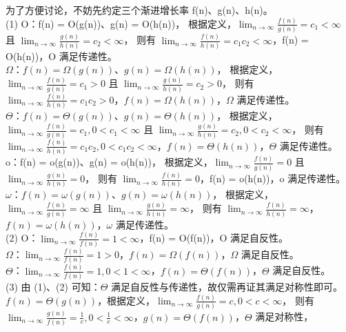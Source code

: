 \documentclass[12pt, a4paper, oneside]{ctexart}
\begin{document}
\newpage
\begin{solution}[2.7]
为了方便讨论，不妨先约定三个渐进增长率 f(n)、g(n)、h(n)。
\\(1) O：f(n) = O(g(n))、g(n) = O(h(n))，
根据定义，$\lim_{n \rightarrow \infty} \frac{f(n)}{g(n)} = c_1 < \infty$ 且 $\lim_{n \rightarrow \infty} \frac{g(n)}{h(n)} = c_2 < \infty$，
则有 $\lim_{n \rightarrow \infty} \frac{f(n)}{h(n)} = c_1c_2 < \infty$，f(n) = O(h(n))，O 满足传递性。
\\$\Omega$：$f(n) = \Omega(g(n))$、$g(n) = \Omega(h(n))$，
根据定义，$\lim_{n \rightarrow \infty} \frac{f(n)}{g(n)} = c_1 > 0$ 且 $\lim_{n \rightarrow \infty} \frac{g(n)}{h(n)} = c_2 > 0$，
则有 $\lim_{n \rightarrow \infty} \frac{f(n)}{h(n)} = c_1 c_2 > 0$，$f(n) = \Omega(h(n))$，$\Omega$ 满足传递性。
\\$\Theta$：$f(n) = \Theta(g(n))$、$g(n) = \Theta(h(n))$，
根据定义，$\lim_{n \rightarrow \infty} \frac{f(n)}{g(n)} = c_1, 0 < c_1 < \infty$ 且 $\lim_{n \rightarrow \infty} \frac{g(n)}{h(n)} = c_2, 0 < c_2 < \infty$，
则有 $\lim_{n \rightarrow \infty} \frac{f(n)}{h(n)} = c_1 c_2, 0 < c_1 c_2 < \infty$，$f(n) = \Theta(h(n))$，$\Theta$ 满足传递性。
\\o：f(n) = o(g(n))、g(n) = o(h(n))，
根据定义，$\lim_{n \rightarrow \infty} \frac{f(n)}{g(n)} = 0$ 且 $\lim_{n \rightarrow \infty} \frac{g(n)}{h(n)} = 0$，
则有 $\lim_{n \rightarrow \infty} \frac{f(n)}{h(n)} = 0$，f(n) = o(h(n))，o 满足传递性。
\\$\omega$：$f(n) = \omega(g(n))$、$g(n) = \omega(h(n))$，
根据定义，$\lim_{n \rightarrow \infty} \frac{f(n)}{g(n)} = \infty$ 且 $\lim_{n \rightarrow \infty} \frac{g(n)}{h(n)} = \infty$，
则有 $\lim_{n \rightarrow \infty} \frac{f(n)}{h(n)} = \infty$，$f(n) = \omega(h(n))$，$\omega$ 满足传递性。
\\(2) O：$\lim_{n \rightarrow \infty} \frac{f(n)}{f(n)} = 1 < \infty$，f(n) = O(f(n))，O 满足自反性。
\\$\Omega$：$\lim_{n \rightarrow \infty} \frac{f(n)}{f(n)} = 1 > 0$，$f(n) = \Omega(f(n))$，$\Omega$ 满足自反性。
\\$\Theta$：$\lim_{n \rightarrow \infty} \frac{f(n)}{f(n)} = 1, 0 < 1 < \infty$，$f(n) = \Theta(f(n))$，$\Theta$ 满足自反性。
\\(3) 由 (1)、(2) 可知：$\Theta$ 满足自反性与传递性，故仅需再证其满足对称性即可。
$f(n) = \Theta(g(n))$，根据定义，$\lim_{n \rightarrow \infty} \frac{f(n)}{g(n)} = c, 0 < c < \infty$，
则有 $\lim_{n \rightarrow \infty} \frac{g(n)}{f(n)} = \frac{1}{c}, 0 < \frac{1}{c} < \infty$，$g(n) = \Theta(f(n))$，$\Theta$ 满足对称性，

\end{solution}
\end{document}
